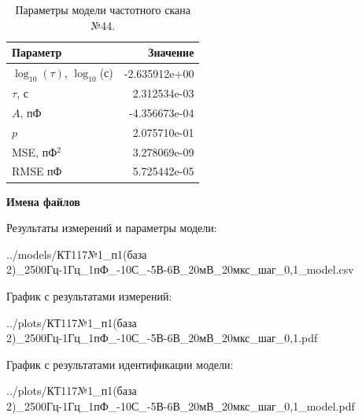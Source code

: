 \begin{table}[!ht]
    \centering
    \caption{Параметры модели частотного скана №44.}
    \begin{tabular}{|l|r|}
        \hline
        Параметр                                       & Значение                  \\ \hline
        $\log_{10}(\tau)$, $\log_{10}$(с)              & -2.635912e+00             \\ \hline
        $\tau$, с                                      & 2.312534e-03              \\ \hline
        $A$, пФ                                        & -4.356673e-04             \\ \hline
        $p$                                            & 2.075710e-01              \\ \hline
        MSE, пФ$^2$                                    & 3.278069e-09              \\ \hline
        RMSE пФ                                        & 5.725442e-05              \\ \hline
    \end{tabular}
    \label{table:frequency_scan_model_44}
\end{table}

\textbf{Имена файлов}

Результаты измерений и параметры модели:

\scriptsize../models/КТ117№1\_п1(база 2)\_2500Гц-1Гц\_1пФ\_-10С\_-5В-6В\_20мВ\_20мкс\_шаг\_0,1\_model.csv
\normalsize

График с результатами измерений:

\scriptsize../plots/КТ117№1\_п1(база 2)\_2500Гц-1Гц\_1пФ\_-10С\_-5В-6В\_20мВ\_20мкс\_шаг\_0,1.pdf
\normalsize

График с результатами идентификации модели:

\scriptsize../plots/КТ117№1\_п1(база 2)\_2500Гц-1Гц\_1пФ\_-10С\_-5В-6В\_20мВ\_20мкс\_шаг\_0,1\_model.pdf
\normalsize

